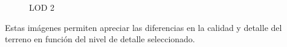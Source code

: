 \begin{itemize}
\begin{figure}[h]
\begin{minipage}{0.3\textwidth}
            \caption{LOD 2}
        \end{minipage}
    \end{figure}
\end{itemize}

Estas imágenes permiten apreciar las diferencias en la calidad y detalle del terreno en función del nivel de detalle seleccionado.









